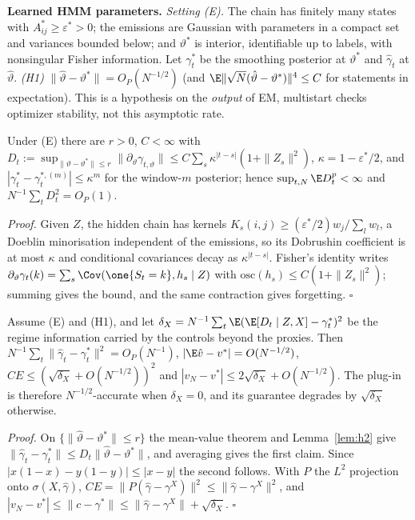 \textbf{Learned HMM parameters.}
\emph{Setting (E).} The chain has finitely many states with $A^*_{ij}\ge\varepsilon^*>0$; the emissions are Gaussian with parameters in a compact set and variances bounded below; and $\vartheta^*$ is interior, identifiable up to labels, with nonsingular Fisher information. Let $\gamma^*_t$ be the smoothing posterior at $\vartheta^*$ and $\hat\gamma_t$ at $\hat\vartheta$. \emph{(H1)} $\|\hat\vartheta-\vartheta^*\|=O_P(N^{-1/2})$ (and $\E\|\sqrt N(\hat\vartheta-\vartheta^*)\|^4\le C$ for statements in expectation). This is a hypothesis on the \emph{output} of EM, multistart checks optimizer stability, not this asymptotic rate.
\begin{lemma}\label{lem:h2}
Under (E) there are $r>0$, $C<\infty$ with $D_t:=\sup_{\|\vartheta-\vartheta^*\|\le r}\|\partial_\vartheta\gamma_{t,\vartheta}\|\le C\sum_s\kappa^{|t-s|}(1+\|Z_s\|^2)$, $\kappa=1-\varepsilon^*/2$, and $|\gamma^*_t-\gamma^{*,(m)}_t|\le\kappa^m$ for the window-$m$ posterior; hence $\sup_{t,N}\E D_t^p<\infty$ and $N^{-1}\sum_tD_t^2=O_P(1)$.
\end{lemma}
\emph{Proof.} Given $Z$, the hidden chain has kernels $K_s(i,j)\ge(\varepsilon^*/2)w_j/\sum_lw_l$, a Doeblin minorisation independent of the emissions, so its Dobrushin coefficient is at most $\kappa$ and conditional covariances decay as $\kappa^{|t-s|}$. Fisher's identity writes $\partial_\vartheta\gamma_t(k)=\sum_s\Cov(\one\{S_t=k\},h_s\mid Z)$ with $\mathrm{osc}(h_s)\le C(1+\|Z_s\|^2)$; summing gives the bound, and the same contraction gives forgetting. $\square$
\begin{proposition}\label{prop:rate}
Assume (E) and (H1), and let $\delta_X=N^{-1}\sum_t\E(\E[D_t\mid Z,X]-\gamma^*_t)^2$ be the regime information carried by the controls beyond the proxies. Then $N^{-1}\sum_t\|\hat\gamma_t-\gamma^*_t\|^2=O_P(N^{-1})$, $|\E\hat v-v^*|=O(N^{-1/2})$, $CE\le(\sqrt{\delta_X}+O(N^{-1/2}))^2$ and $|v_N-v^*|\le2\sqrt{\delta_X}+O(N^{-1/2})$. The plug-in is therefore $N^{-1/2}$-accurate when $\delta_X=0$, and its guarantee degrades by $\sqrt{\delta_X}$ otherwise.
\end{proposition}
\emph{Proof.} On $\{\|\hat\vartheta-\vartheta^*\|\le r\}$ the mean-value theorem and Lemma~\ref{lem:h2} give $\|\hat\gamma_t-\gamma^*_t\|\le D_t\|\hat\vartheta-\vartheta^*\|$, and averaging gives the first claim. Since $|x(1-x)-y(1-y)|\le|x-y|$ the second follows. With $P$ the $L^2$ projection onto $\sigma(X,\hat\gamma)$, $CE=\|P(\hat\gamma-\gamma^X)\|^2\le\|\hat\gamma-\gamma^X\|^2$, and $|v_N-v^*|\le\|c-\gamma^*\|\le\|\hat\gamma-\gamma^X\|+\sqrt{\delta_X}$. $\square$
